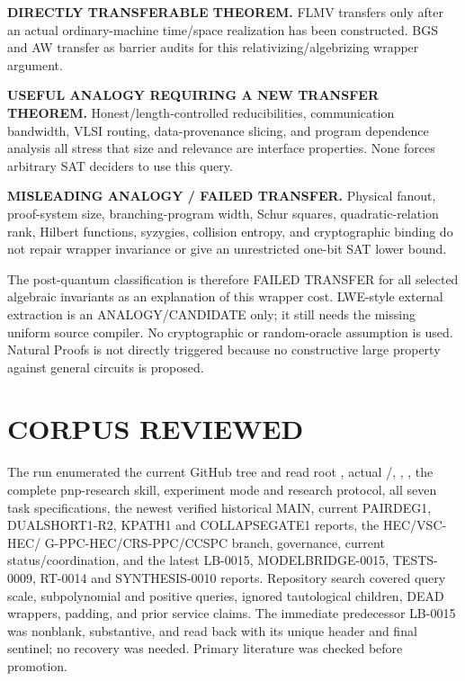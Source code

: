 \documentclass[11pt]{article}
\begin{document}
\begin{description}[leftmargin=0cm,labelwidth=0cm]
\item[] \textbf{DIRECTLY TRANSFERABLE THEOREM.}
FLMV transfers only after an actual ordinary-machine time/space realization
has been constructed.  BGS and AW transfer as barrier audits for this
relativizing/algebrizing wrapper argument.
\item[] \textbf{USEFUL ANALOGY REQUIRING A NEW TRANSFER THEOREM.}
Honest/length-controlled reducibilities, communication bandwidth, VLSI
routing, data-provenance slicing, and program dependence analysis all stress
that size and relevance are interface properties.  None forces arbitrary SAT
deciders to use this query.
\item[] \textbf{MISLEADING ANALOGY / FAILED TRANSFER.}
Physical fanout, proof-system size, branching-program width, Schur squares,
quadratic-relation rank, Hilbert functions, syzygies, collision entropy, and
cryptographic binding do not repair wrapper invariance or give an unrestricted
one-bit SAT lower bound.
\end{description}

The post-quantum classification is therefore FAILED TRANSFER for all selected
algebraic invariants as an explanation of this wrapper cost.  LWE-style
external extraction is an ANALOGY/CANDIDATE only; it still needs the missing
uniform source compiler.  No cryptographic or random-oracle assumption is
used.  Natural Proofs is not directly triggered because no constructive
large property against general circuits is proposed.

\section{CORPUS REVIEWED}

The run enumerated the current GitHub tree and read root ,
actual /, , ,
the complete pnp-research skill, experiment mode and research protocol, all
seven task specifications, the newest verified historical MAIN, current
PAIRDEG1, DUALSHORT1-R2, KPATH1 and COLLAPSEGATE1 reports, the HEC/VSC-HEC/
G-PPC-HEC/CRS-PPC/CCSPC branch, governance, current status/coordination, and
the latest LB-0015, MODELBRIDGE-0015, TESTS-0009, RT-0014 and SYNTHESIS-0010
reports.  Repository search covered query scale, subpolynomial and positive
queries, ignored tautological children, DEAD wrappers, padding, and prior
service claims.  The immediate predecessor LB-0015 was nonblank, substantive,
and read back with its unique header and final sentinel; no recovery was
needed.  Primary literature was checked before promotion.
\end{document}
